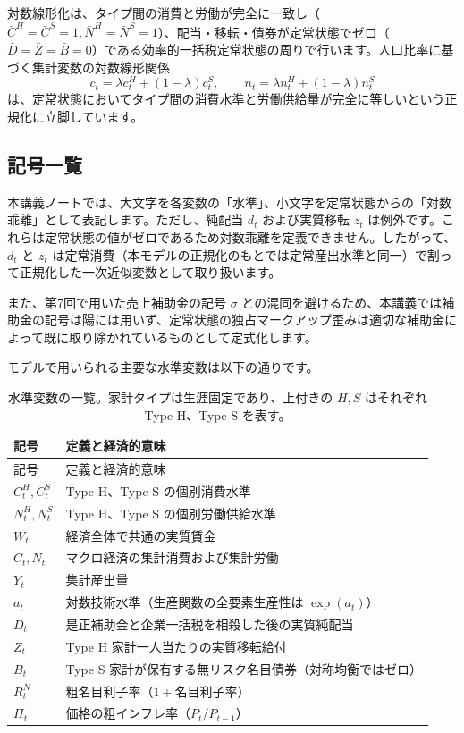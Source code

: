 \documentclass[
  japanese,
  lualatex,
  ja=standard,
  12pt,
  a4paper]{ltjsarticle}
\begin{document}
対数線形化は、タイプ間の消費と労働が完全に一致し（\(\bar{C}^H = \bar{C}^S = 1, \bar{N}^H = \bar{N}^S = 1\)）、配当・移転・債券が定常状態でゼロ（\(\bar{D} = \bar{Z} = \bar{B} = 0\)）である効率的一括税定常状態の周りで行います。人口比率に基づく集計変数の対数線形関係
\[
c_t = \lambda c_t^H + (1-\lambda) c_t^S,
\qquad
n_t = \lambda n_t^H + (1-\lambda) n_t^S
\]
は、定常状態においてタイプ間の消費水準と労働供給量が完全に等しいという正規化に立脚しています。

\subsection{記号一覧}\label{ux8a18ux53f7ux4e00ux89a7}

本講義ノートでは、大文字を各変数の「水準」、小文字を定常状態からの「対数乖離」として表記します。ただし、純配当
\(d_t\) および実質移転 \(z_t\)
は例外です。これらは定常状態の値がゼロであるため対数乖離を定義できません。したがって、\(d_t\)
と \(z_t\)
は定常消費（本モデルの正規化のもとでは定常産出水準と同一）で割って正規化した一次近似変数として取り扱います。

また、第7回で用いた売上補助金の記号 \(\sigma\)
との混同を避けるため、本講義では補助金の記号は陽には用いず、定常状態の独占マークアップ歪みは適切な補助金によって既に取り除かれているものとして定式化します。

モデルで用いられる主要な水準変数は以下の通りです。

\begin{longtable}[]{@{}ll@{}}
\caption{水準変数の一覧。家計タイプは生涯固定であり、上付きの \(H, S\)
はそれぞれ Type H、Type S を表す。}\tabularnewline
\toprule\noalign{}
記号 & 定義と経済的意味 \\
\midrule\noalign{}
\endfirsthead
\toprule\noalign{}
記号 & 定義と経済的意味 \\
\midrule\noalign{}
\endhead
\bottomrule\noalign{}
\endlastfoot
\(C_t^H, C_t^S\) & Type H、Type S の個別消費水準 \\
\(N_t^H, N_t^S\) & Type H、Type S の個別労働供給水準 \\
\(W_t\) & 経済全体で共通の実質賃金 \\
\(C_t, N_t\) & マクロ経済の集計消費および集計労働 \\
\(Y_t\) & 集計産出量 \\
\(a_t\) & 対数技術水準（生産関数の全要素生産性は \(\exp(a_t)\)） \\
\(D_t\) & 是正補助金と企業一括税を相殺した後の実質純配当 \\
\(Z_t\) & Type H 家計一人当たりの実質移転給付 \\
\(B_t\) & Type S 家計が保有する無リスク名目債券（対称均衡ではゼロ） \\
\(R_t^N\) & 粗名目利子率（\(1 + \text{名目利子率}\)） \\
\(\Pi_t\) & 価格の粗インフレ率（\(P_t / P_{t-1}\)） \\
\end{longtable}
\end{document}
